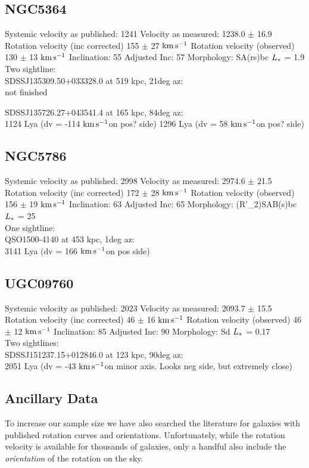 \documentclass[iop]{emulateapj-rtx4}
\newcommand{\kms}{$\rm km\, s^{-1}$}
\begin{document}
\subsection{NGC5364}
Systemic velocity as published: 1241
Velocity as measured: 1238.0 $\pm$ 16.9
Rotation velocity (inc corrected) 155 $\pm$ 27 \kms
Rotation velocity (observed) 130 $\pm$ 13 \kms
Inclination: 55
Adjusted Inc: 57
Morphology: SA(rs)bc
$L_{\**}$ = 1.9 \\

Two sightline: \\
SDSSJ135309.50+033328.0 at 519 kpc, 21deg az: \\
not finished

SDSSJ135726.27+043541.4 at 165 kpc, 84deg az: \\
1124 Lya (dv = -114 \kms on pos? side)
1296 Lya (dv = 58 \kms on pos? side)



\subsection{NGC5786}
Systemic velocity as published: 2998
Velocity as measured: 2974.6 $\pm$ 21.5
Rotation velocity (inc corrected) 172 $\pm$ 28 \kms
Rotation velocity (observed) 156 $\pm$ 19 \kms
Inclination: 63
Adjusted Inc: 65
Morphology: (R'\_2)SAB(s)bc
$L_{\**}$ = 25 \\

One sightline: \\
QSO1500-4140 at 453 kpc, 1deg az: \\
3141 Lya (dv = 166 \kms on pos side)


\subsection{UGC09760}
Systemic velocity as published: 2023
Velocity as measured: 2093.7 $\pm$ 15.5
Rotation velocity (inc corrected) 46 $\pm$ 16 \kms
Rotation velocity (observed) 46 $\pm$ 12 \kms
Inclination: 85
Adjusted Inc: 90
Morphology: Sd
$L_{\**}$ = 0.17 \\

Two sightlines: \\
SDSSJ151237.15+012846.0 at 123 kpc, 90deg az: \\
2051 Lya (dv = -43 \kms on minor axis. Looks neg side, but extremely close)



\subsection{Ancillary Data}
To increase our sample size we have also searched the literature for galaxies with published rotation curves and orientations. Unfortunately, while the rotation velocity is available for thousands of galaxies, only a handful also include the \emph{orientation} of the rotation on the sky. 
\end{document}
